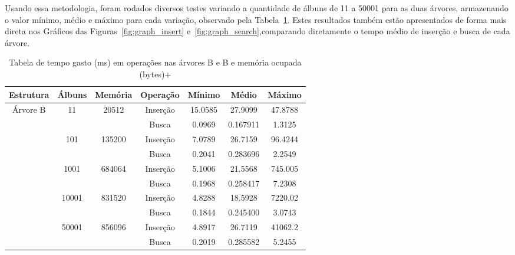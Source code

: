 \documentclass[12pt]{article}
\begin{document}
Usando essa metodologia, foram rodados diversos testes variando a quantidade de
álbuns de 11 a 50001 para as duas árvores, armazenando o valor mínimo, médio e
máximo para cada variação, observado pela Tabela~\ref{tab:resultados}.
Estes resultados também estão apresentados de forma mais direta nos Gráficos das
Figuras~\ref{fig:graph_insert} e~\ref{fig:graph_search},comparando diretamente o
tempo médio de inserção e busca de cada árvore.

\begin{table}[ht]
\centering
\caption{Tabela de tempo gasto (ms) em operações nas árvores B e B e memória ocupada (bytes)\nolinebreak+}
\label{tab:resultados}
\begin{tabular}{|c|c|c|c|c|c|c|}
\hline
  Estrutura & Álbuns & Memória & Operação & Mínimo & Médio & Máximo \\ \hline
  \multirow{11}{*}{Árvore B} & \multirow{2}{*}{11} & \multirow{2}{*}{20512} & Inserção & 15.0585 & 27.9099 & 47.8788 \\
                            & & & Busca    & 0.0969 & 0.167911 & 1.3125	 \\
                  \cline{2-7} &  \multirow{2}{*}{101} & \multirow{2}{*}{135200} & Inserção & 7.0789 & 26.7159 & 96.4244\\
                            & & & Busca    & 0.2041 & 0.283696 & 2.2549	 \\
                  \cline{2-7} &  \multirow{2}{*}{1001} & \multirow{2}{*}{684064} & Inserção & 5.1006 & 21.5568 & 745.005 \\
                            & & & Busca    & 0.1968 & 0.258417 & 7.2308	 \\
                  \cline{2-7} &  \multirow{2}{*}{10001} & \multirow{2}{*}{831520} & Inserção & 4.8288 & 18.5928 & 7220.02  \\
                            & & & Busca    & 0.1844 & 0.245400 & 3.0743	\\
                  \cline{2-7} &  \multirow{2}{*}{50001} & \multirow{2}{*}{856096} & Inserção & 4.8917 & 26.7119 & 41062.2\\
                            & & & Busca    & 0.2019 & 0.285582 & 5.2455	 \\
  \hline


\end{tabular}
\end{table}
\end{document}
